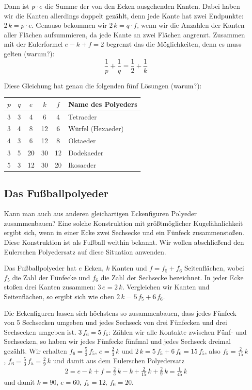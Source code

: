 \documentclass[11pt]{article}
\begin{document}
Dann ist $p\cdot e$ die Summe der von den Ecken ausgehenden Kanten. Dabei
haben wir die Kanten allerdings doppelt gezählt, denn jede Kante hat zwei
Endpunkte: $2\,k = p\cdot e$. Genauso bekommen wir $2\,k = q\cdot f$, wenn wir
die Anzahlen der Kanten aller Flächen aufsummieren, da jede Kante an zwei
Flächen angrenzt. Zusammen mit der Eulerformel $e-k+f=2$ begrenzt das die
Möglichkeiten, denn es muss gelten (warum?):
\[\frac{1}{p} + \frac{1}{q} =  \frac12 +\frac{1}{k}\]

Diese Gleichung hat genau die folgenden fünf Lösungen (warum?):
\begin{center}
  \begin{tabular}{|cc|ccc|l|}\hline
    $p$ & $q$ & $e$ & $k$ & $f$ & Name des Polyeders \\\hline
    3 & 3 &  4 &  6 &  4 & Tetraeder\\
    3 & 4 &  8 & 12 &  6 & Würfel (Hexaeder)\\
    4 & 3 &  6 & 12 &  8 & Oktaeder\\
    3 & 5 & 20 & 30 & 12 & Dodekaeder\\
    5 & 3 & 12 & 30 & 20 & Ikosaeder\\\hline
  \end{tabular}
\end{center}

\subsection*{Das Fußballpolyeder}

Kann man auch aus anderen gleichartigen Eckenfiguren Polyeder zusammenbauen?
Eine solche Konstruktion mit größtmöglicher Kugelähnlichkeit ergibt sich, wenn
in einer Ecke zwei Sechsecke und ein Fünfeck zusammenstoßen.  Diese
Konstruktion ist als Fußball weithin bekannt. Wir wollen abschließend den
Eulerschen Polyedersatz auf diese Situation anwenden.

Das Fußballpolyeder hat $e$ Ecken, $k$ Kanten und $f=f_5+f_6$ Seitenflächen,
wobei $f_5$ die Zahl der Fünfecke und $f_6$ die Zahl der Sechsecke bezeichnet.
In jeder Ecke stoßen drei Kanten zusammen: $3\,e=2\,k$.  Vergleichen wir
Kanten und Seitenflächen, so ergibt sich wie oben $2\,k=5\,f_5+6\,f_6$.

Die Eckenfiguren lassen sich höchstens so zusammenbauen, dass jedes Fünfeck
von 5 Sechsecken umgeben und jedes Sechseck von drei Fünfecken und drei
Sechsecken umgeben ist.  $3\,f_6=5\,f_5$: Zählen wir alle Kontakte zwischen
Fünf- und Sechsecken, so haben wir jedes Fünfecke fünfmal und jedes Sechseck
dreimal gezählt.  Wir erhalten $f_6=\frac53\,f_5$, $e=\frac23\,k$ und
$2\,k=5\,f_5+6\,f_6=15\,f_5$, also $f_5=\frac{2}{15}\,k$,
$f_6=\frac53\,f_5=\frac{2}{9}\,k$ und damit aus dem Eulerschen Polyedersatz
\begin{gather*}
  2=e-k+f=\frac23\,k-k+\frac{2}{15}\,k+\frac{2}{9}\,k=\frac{1}{45}\,k
\end{gather*}
und damit $k=90$, $e=60$, $f_5=12$, $f_6=20$. 
\end{document}

